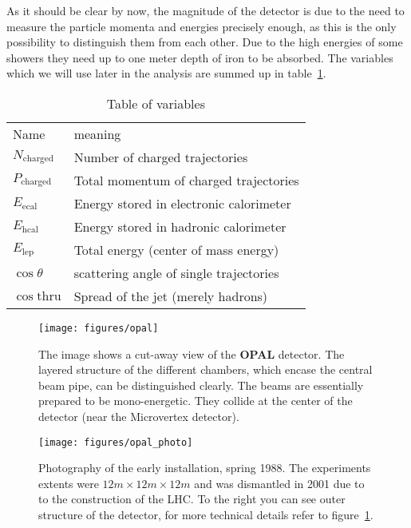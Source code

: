 As it should be clear by now, the magnitude of the detector is due to the need to measure the particle momenta and energies
precisely enough, as this is the only possibility to distinguish them from each other. Due to the high energies of some showers
they need up to one meter depth of iron to be absorbed. The variables which we will use later in the analysis are summed up
in table~\ref{tab:vars}.
\begin{table}[htpb]
    \centering
    \caption{Table of variables}
    \label{tab:vars}
    \begin{tabular}{l|l}
  \rowcolor{LightCyan} Name & meaning \\ 
    $N_{\mathrm{charged} }$ & Number of charged trajectories \\
    $P_{\mathrm{charged} }$ & Total momentum of charged trajectories \\
    $E_{\mathrm{ecal}}$ & Energy stored in electronic calorimeter \\
    $E_{\mathrm{hcal}}$ & Energy stored in hadronic calorimeter \\
    $E_{\mathrm{lep}}$ & Total energy (center of mass energy) \\
    $\cos\theta$ & scattering angle of single trajectories \\
    $\cos\mathrm{thru} $ & Spread of the jet (merely hadrons)\\
    \end{tabular}
\end{table}

\begin{figure}[htpb]
    \centering
    \texttt{[image: figures/opal]}
    \caption{The image shows a cut-away view of the \textbf{OPAL} detector\cite{CERN_OPAL}. The layered structure of the
    different chambers, which encase the central beam pipe, can be distinguished clearly. The beams are essentially
prepared to be mono-energetic. They collide at the center of the detector (near the Microvertex detector).}
    \label{fig:opal1}
\end{figure}

\begin{figure}[htpb]
    \centering
    \texttt{[image: figures/opal\_photo]}
    \caption{Photography of the early installation, spring 1988\cite{CERN_OPAL}. The experiments extents were
    $12m \times 12m \times 12m$ and was dismantled in 2001 due to to the construction of the LHC. To the right you can 
see outer structure of the detector, for more technical details refer to figure~\ref{fig:opal1}. }
    \label{fig:opal_photo}
\end{figure}

